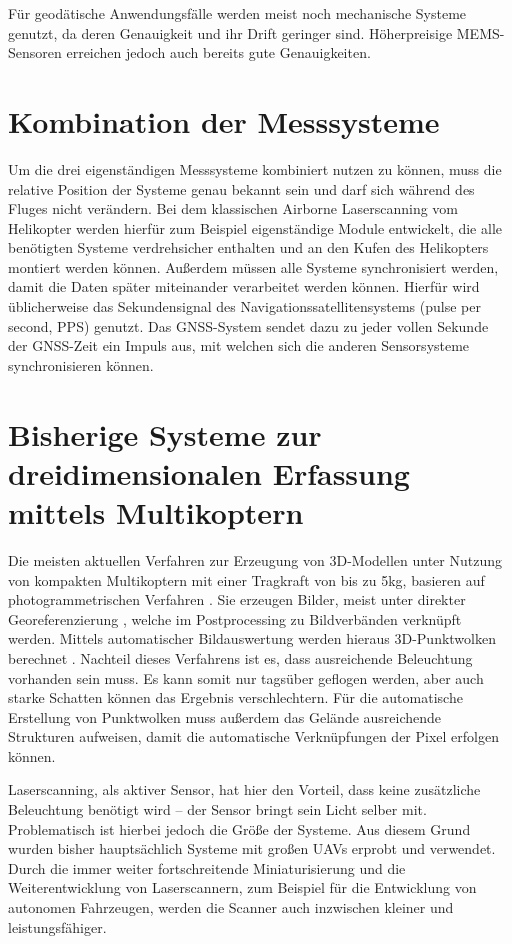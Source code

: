 \documentclass[a4paper,12pt,bibliography=totoc, listof=totoc,titlepage,pointlessnumbers]{scrreprt}
\begin{document}
Für geodätische Anwendungsfälle werden meist noch mechanische Systeme genutzt, da deren Genauigkeit und ihr Drift geringer sind. Höherpreisige MEMS-Sensoren erreichen jedoch auch bereits gute Genauigkeiten. \citep{imar}

\section{Kombination der Messsysteme}
Um die drei eigenständigen Messsysteme kombiniert nutzen zu können, muss die relative Position der Systeme genau bekannt sein und darf sich während des Fluges nicht verändern. Bei dem klassischen Air\-borne Laser\-scan\-ning vom Helikopter werden hierfür zum Beispiel eigenständige Module entwickelt, die alle benötigten Systeme verdrehsicher enthalten und an den Kufen des Helikopters montiert werden können. Außerdem müssen alle Systeme synchronisiert werden, damit die Daten später miteinander verarbeitet werden können. Hierfür wird üblicherweise das Sekundensignal des Navigationssatellitensystems (pulse per second, PPS) genutzt. Das GNSS-System sendet dazu zu jeder vollen Sekunde der GNSS-Zeit ein Impuls aus, mit welchen sich die anderen Sensorsysteme synchronisieren können. \citep[S. 23f]{beraldin}

\section{Bisherige Systeme zur dreidimensionalen Erfassung mittels Multikoptern}
Die meisten aktuellen Verfahren zur Erzeugung von 3D-Modellen unter Nutzung von kompakten Multikoptern mit einer Tragkraft von bis zu 5kg, basieren auf photogrammetrischen Verfahren \citep{carlos}. Sie erzeugen Bilder, meist unter direkter Georeferenzierung \cite[S. 16f]{uav}, welche im Postprocessing zu Bildverbänden verknüpft werden. Mittels automatischer Bildauswertung werden hieraus 3D-Punktwolken berechnet \cite[S. 18f]{uav}. Nachteil dieses Verfahrens ist es, dass ausreichende Beleuchtung vorhanden sein muss. Es kann somit nur tagsüber geflogen werden, aber auch starke Schatten können das Ergebnis verschlechtern. Für die automatische Erstellung von Punktwolken muss außerdem das Gelände ausreichende Strukturen aufweisen, damit die automatische Verknüpfungen der Pixel erfolgen können.

Laser\-scan\-ning, als aktiver Sensor, hat hier den Vorteil, dass keine zusätzliche Beleuchtung benötigt wird -- der Sensor bringt sein Licht selber mit. Problematisch ist hierbei jedoch die Größe der Systeme. Aus diesem Grund wurden bisher hauptsächlich Systeme mit großen UAVs erprobt und verwendet. Durch die immer weiter fortschreitende Miniaturisierung und die Weiterentwicklung von Laser\-scan\-nern, zum Beispiel für die Entwicklung von autonomen Fahrzeugen, werden die Scanner auch inzwischen kleiner und leistungsfähiger. \citep[S. 19]{uav}
\end{document}
